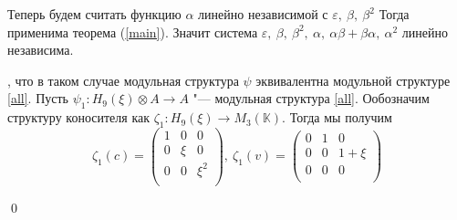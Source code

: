 \documentclass[12pt, reqno, a4paper, oneside, notitlepage]{amsart}
\makeatletter
\theoremstyle{mytheoremstyle}
\theoremstyle{myremarkstyle}
\numberwithin{equation}{section}
\renewenvironment{proof}[1][\proofname]{\par\indent {\bfseries #1\@addpunct{.} }}{\qed}
\makeatother
\begin{document}
\begin{proof}
	Теперь будем считать функцию $\alpha$ линейно независимой с $\varepsilon,\ \beta,\ \beta^2$
	Тогда применима теорема (\ref{main}). 
	Значит система $\varepsilon,\ \beta,\ \beta^2,\ \alpha,\ \alpha\beta+\beta\alpha,\ \alpha^2$ линейно независима.
	
    , что в таком случае модульная структура $\psi$ эквивалентна модульной структуре \ref{all}.
    Пусть $\psi_1:H_9(\xi) \otimes A \to A$ "--- модульная структура \ref{all}.
    Ообозначим структуру коносителя как $\zeta_1:H_9(\xi) \to M_3(\mathbb{K})$.
    Тогда мы получим \[
    \zeta_1(c) = 
    \begin{pmatrix}
        1 & 0 & 0\\
        0 & \xi & 0\\
        0 & 0 & \xi^2\\
    \end{pmatrix},\ 
    \zeta_1(v) = 
    \begin{pmatrix}
        0 & 1 & 0\\
        0 & 0 & 1+\xi\\
        0 & 0 & 0\\
    \end{pmatrix}
    \]


\end{proof}
\end{document}
